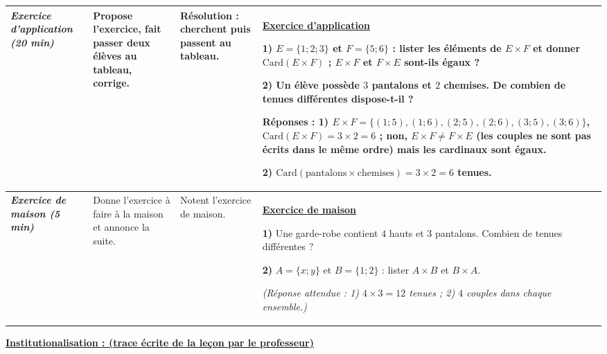 \documentclass[10pt]{article}
\newcommand{\titreR}[1]{\underline{\textcolor{rougetitre}{\bfseries #1}}}
\newcommand{\app}{\titreR{Exercice d'application}}
\newcommand{\maison}{\underline{\textcolor{rougemaison}{\bfseries Exercice de maison}}}
\newcommand{\moment}[1]{\textbf{\itshape #1}}
\begin{document}
\begin{longtable}{|p{2.35cm}|p{5.35cm}|p{4.55cm}|p{13.85cm}|}
\moment{Exercice d'application (20 min)} &
Propose l'exercice, fait passer deux élèves au tableau, corrige. &
\textbf{Résolution} : cherchent puis passent au tableau. &
\app \par
\textbf{1)} $E=\{1;2;3\}$ et $F=\{5;6\}$ : lister les éléments de $E\times F$ et donner
$\mathrm{Card}(E\times F)$ ; $E\times F$ et $F\times E$ sont-ils égaux ? \par
\textbf{2)} Un élève possède $3$ pantalons et $2$ chemises. De combien de tenues
différentes dispose-t-il ? \par
\textbf{Réponses :} \textbf{1)} $E\times F=\{(1;5),(1;6),(2;5),(2;6),(3;5),(3;6)\}$,
$\mathrm{Card}(E\times F)=3\times2=6$ ; non, $E\times F\neq F\times E$ (les couples ne
sont pas écrits dans le même ordre) mais les cardinaux sont égaux. \par
\textbf{2)} $\mathrm{Card}(\text{pantalons}\times\text{chemises})=3\times2=6$ tenues. \\ \hline

\moment{Exercice de maison (5 min)} &
Donne l'exercice à faire à la maison et annonce la suite. &
Notent l'exercice de maison. &
\maison \par
\textbf{1)} Une garde-robe contient $4$ hauts et $3$ pantalons. Combien de tenues
différentes ? \par
\textbf{2)} $A=\{x;y\}$ et $B=\{1;2\}$ : lister $A\times B$ et $B\times A$. \par
\textit{(Réponse attendue : 1) $4\times3=12$ tenues ; 2) $4$ couples dans chaque
ensemble.)} \\ \hline
\end{longtable}

\begin{center}
\underline{\textcolor{rougetitre}{\large\bfseries Institutionalisation \; : \; (trace écrite de la leçon par le professeur)}}
\end{center}
\end{document}
